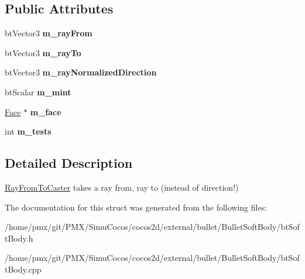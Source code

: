 \subsection*{Public Attributes}
\begin{DoxyCompactItemize}
\item 
\mbox{\label{structbtSoftBody_1_1RayFromToCaster_ab3ff09a98d5e68aba2263e273f322b54}} 
bt\+Vector3 {\bfseries m\+\_\+ray\+From}
\item 
\mbox{\label{structbtSoftBody_1_1RayFromToCaster_a8d6bc6ea5ac0af8f69a2a1fbe5c90330}} 
bt\+Vector3 {\bfseries m\+\_\+ray\+To}
\item 
\mbox{\label{structbtSoftBody_1_1RayFromToCaster_aaeb2327d0033ed8ee400e9fef264417d}} 
bt\+Vector3 {\bfseries m\+\_\+ray\+Normalized\+Direction}
\item 
\mbox{\label{structbtSoftBody_1_1RayFromToCaster_a30f1a9893610c9f60388fea3d115a53e}} 
bt\+Scalar {\bfseries m\+\_\+mint}
\item 
\mbox{\label{structbtSoftBody_1_1RayFromToCaster_a1857b969f47f52d8fb5607bf943836af}} 
\hyperlink{structbtSoftBody_1_1Face}{Face} $\ast$ {\bfseries m\+\_\+face}
\item 
\mbox{\label{structbtSoftBody_1_1RayFromToCaster_a3363fdfd71f927b7f1af70bf16843194}} 
int {\bfseries m\+\_\+tests}
\end{DoxyCompactItemize}


\subsection{Detailed Description}
\hyperlink{structbtSoftBody_1_1RayFromToCaster}{Ray\+From\+To\+Caster} takes a ray from, ray to (instead of direction!) 

The documentation for this struct was generated from the following files\+:\begin{DoxyCompactItemize}
\item 
/home/pmx/git/\+P\+M\+X/\+Simu\+Cocos/cocos2d/external/bullet/\+Bullet\+Soft\+Body/bt\+Soft\+Body.\+h\item 
/home/pmx/git/\+P\+M\+X/\+Simu\+Cocos/cocos2d/external/bullet/\+Bullet\+Soft\+Body/bt\+Soft\+Body.\+cpp\end{DoxyCompactItemize}
